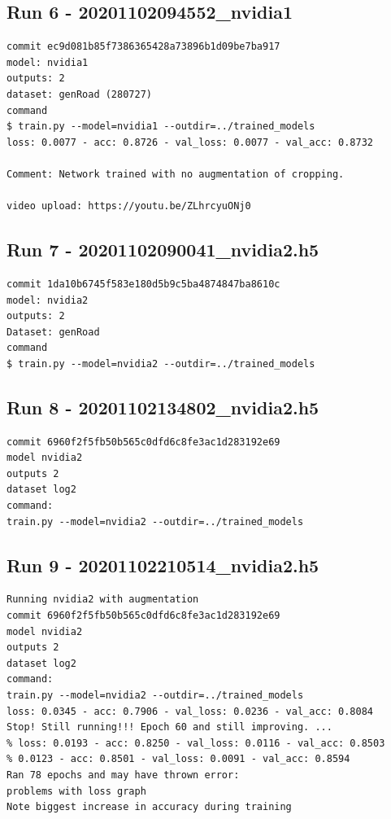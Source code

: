 \subsection{Run 6 - 20201102094552\_nvidia1}
\begin{verbatim}
commit ec9d081b85f7386365428a73896b1d09be7ba917
model: nvidia1
outputs: 2
dataset: genRoad (280727)
command
$ train.py --model=nvidia1 --outdir=../trained_models
loss: 0.0077 - acc: 0.8726 - val_loss: 0.0077 - val_acc: 0.8732

Comment: Network trained with no augmentation of cropping.

video upload: https://youtu.be/ZLhrcyuONj0
\end{verbatim}

\subsection{Run 7 - 20201102090041\_nvidia2.h5}
\begin{verbatim}
commit 1da10b6745f583e180d5b9c5ba4874847ba8610c
model: nvidia2
outputs: 2
Dataset: genRoad
command
$ train.py --model=nvidia2 --outdir=../trained_models
\end{verbatim}

\subsection{Run 8 - 20201102134802\_nvidia2.h5}
\begin{verbatim}
commit 6960f2f5fb50b565c0dfd6c8fe3ac1d283192e69
model nvidia2
outputs 2
dataset log2
command:
train.py --model=nvidia2 --outdir=../trained_models
\end{verbatim}


\subsection{Run 9 - 20201102210514\_nvidia2.h5}
\begin{verbatim}
Running nvidia2 with augmentation
commit 6960f2f5fb50b565c0dfd6c8fe3ac1d283192e69
model nvidia2
outputs 2
dataset log2
command:
train.py --model=nvidia2 --outdir=../trained_models
loss: 0.0345 - acc: 0.7906 - val_loss: 0.0236 - val_acc: 0.8084
Stop! Still running!!! Epoch 60 and still improving. ...
% loss: 0.0193 - acc: 0.8250 - val_loss: 0.0116 - val_acc: 0.8503
% 0.0123 - acc: 0.8501 - val_loss: 0.0091 - val_acc: 0.8594
Ran 78 epochs and may have thrown error:
problems with loss graph
Note biggest increase in accuracy during training
\end{verbatim}

